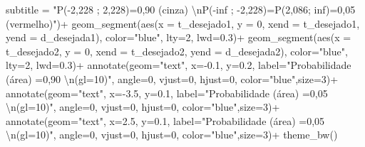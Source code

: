 \documentclass[
]{book}
\newenvironment{Shaded}{\begin{snugshade}}{\end{snugshade}}
\newcommand{\AttributeTok}[1]{\textcolor[rgb]{0.77,0.63,0.00}{#1}}
\newcommand{\DecValTok}[1]{\textcolor[rgb]{0.00,0.00,0.81}{#1}}
\newcommand{\FloatTok}[1]{\textcolor[rgb]{0.00,0.00,0.81}{#1}}
\newcommand{\FunctionTok}[1]{\textcolor[rgb]{0.00,0.00,0.00}{#1}}
\newcommand{\NormalTok}[1]{#1}
\newcommand{\SpecialCharTok}[1]{\textcolor[rgb]{0.00,0.00,0.00}{#1}}
\newcommand{\StringTok}[1]{\textcolor[rgb]{0.31,0.60,0.02}{#1}}
\begin{document}
\begin{Shaded}
\begin{Highlighting}[]
       \AttributeTok{subtitle =} \StringTok{"P({-}2,228 ; 2,228)=0,90 (cinza) }\SpecialCharTok{\textbackslash{}n}\StringTok{P({-}inf ; {-}2,228)=P(2,086; inf)=0,05 (vermelho)"}\NormalTok{)}\SpecialCharTok{+}
  \FunctionTok{geom\_segment}\NormalTok{(}\FunctionTok{aes}\NormalTok{(}\AttributeTok{x =}\NormalTok{ t\_desejado1, }\AttributeTok{y =} \DecValTok{0}\NormalTok{, }\AttributeTok{xend =}\NormalTok{ t\_desejado1, }\AttributeTok{yend =}\NormalTok{ d\_desejada1), }\AttributeTok{color=}\StringTok{"blue"}\NormalTok{, }\AttributeTok{lty=}\DecValTok{2}\NormalTok{, }\AttributeTok{lwd=}\FloatTok{0.3}\NormalTok{)}\SpecialCharTok{+}
  \FunctionTok{geom\_segment}\NormalTok{(}\FunctionTok{aes}\NormalTok{(}\AttributeTok{x =}\NormalTok{ t\_desejado2, }\AttributeTok{y =} \DecValTok{0}\NormalTok{, }\AttributeTok{xend =}\NormalTok{ t\_desejado2, }\AttributeTok{yend =}\NormalTok{ d\_desejada2), }\AttributeTok{color=}\StringTok{"blue"}\NormalTok{, }\AttributeTok{lty=}\DecValTok{2}\NormalTok{, }\AttributeTok{lwd=}\FloatTok{0.3}\NormalTok{)}\SpecialCharTok{+}
  \FunctionTok{annotate}\NormalTok{(}\AttributeTok{geom=}\StringTok{"text"}\NormalTok{, }\AttributeTok{x=}\SpecialCharTok{{-}}\FloatTok{0.1}\NormalTok{, }\AttributeTok{y=}\FloatTok{0.2}\NormalTok{, }\AttributeTok{label=}\StringTok{"Probabilidade (área) =0,90 }\SpecialCharTok{\textbackslash{}n}\StringTok{(gl=10)"}\NormalTok{, }\AttributeTok{angle=}\DecValTok{0}\NormalTok{, }\AttributeTok{vjust=}\DecValTok{0}\NormalTok{, }\AttributeTok{hjust=}\DecValTok{0}\NormalTok{, }\AttributeTok{color=}\StringTok{"blue"}\NormalTok{,}\AttributeTok{size=}\DecValTok{3}\NormalTok{)}\SpecialCharTok{+}
  \FunctionTok{annotate}\NormalTok{(}\AttributeTok{geom=}\StringTok{"text"}\NormalTok{, }\AttributeTok{x=}\SpecialCharTok{{-}}\FloatTok{3.5}\NormalTok{, }\AttributeTok{y=}\FloatTok{0.1}\NormalTok{, }\AttributeTok{label=}\StringTok{"Probabilidade (área) =0,05 }\SpecialCharTok{\textbackslash{}n}\StringTok{(gl=10)"}\NormalTok{, }\AttributeTok{angle=}\DecValTok{0}\NormalTok{, }\AttributeTok{vjust=}\DecValTok{0}\NormalTok{, }\AttributeTok{hjust=}\DecValTok{0}\NormalTok{, }\AttributeTok{color=}\StringTok{"blue"}\NormalTok{,}\AttributeTok{size=}\DecValTok{3}\NormalTok{)}\SpecialCharTok{+}
  \FunctionTok{annotate}\NormalTok{(}\AttributeTok{geom=}\StringTok{"text"}\NormalTok{, }\AttributeTok{x=}\FloatTok{2.5}\NormalTok{, }\AttributeTok{y=}\FloatTok{0.1}\NormalTok{, }\AttributeTok{label=}\StringTok{"Probabilidade (área) =0,05 }\SpecialCharTok{\textbackslash{}n}\StringTok{(gl=10)"}\NormalTok{, }\AttributeTok{angle=}\DecValTok{0}\NormalTok{, }\AttributeTok{vjust=}\DecValTok{0}\NormalTok{, }\AttributeTok{hjust=}\DecValTok{0}\NormalTok{, }\AttributeTok{color=}\StringTok{"blue"}\NormalTok{,}\AttributeTok{size=}\DecValTok{3}\NormalTok{)}\SpecialCharTok{+}
  \FunctionTok{theme\_bw}\NormalTok{()}
\end{Highlighting}
\end{Shaded}
\end{document}
